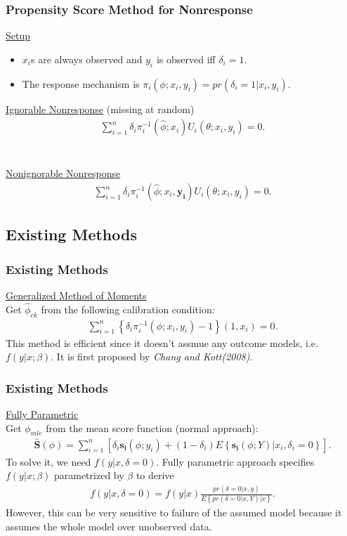 \documentclass{beamer}
\newcommand{\bra}[1]{\left(#1\right)}
\newcommand{\cbra}[1]{\left\{#1\right\}}
\newcommand{\sbra}[1]{\left[#1\right]}
\newcommand{\e}[1]{$\displaystyle{#1}$}
\newcommand{\al}[1]{\begin{align*}#1\end{align*}}
\begin{document}
\begin{frame}
\frametitle{Propensity Score Method for Nonresponse}
\underline{Setup}
\begin{itemize}
\item \e{x_i}s are always observed and \e{y_i} is observed iff \e{\delta_i=1}.
\item The response mechanism is \e{\pi_i\bra{\phi; x_i, y_i} = pr\bra{\delta_i=1 | x_i, y_i}}.
\end{itemize}\bigskip

\underline{Ignorable Nonresponse} (missing at random)
\al{\sum_{i=1}^{n} \delta_{i} {\pi_{i}^{-1}\bra{\hat\phi; x_i}U_i\bra{\theta; x_i, y_i}} = 0.}\\~\\

\underline{Nonignorable Nonresponse}
\al{\sum_{i=1}^{n} \delta_{i} {\pi_{i}^{-1}\bra{\hat\phi; x_i, \bm{y_i}}U_i\bra{\theta; x_i, y_i}} = 0.}
\end{frame}

\subsection{Existing Methods}
\begin{frame}
\frametitle{Existing Methods}
\underline{Generalized Method of Moments}\\\medskip
Get \e{\hat\phi_{ck}} from the following calibration condition:
\al{\sum_{i=1}^{n} \cbra{\delta_{i} \pi_{i}^{-1}\bra{\phi; x_i, y_i} - 1}\bra{1, x_i} = 0.}
This method is efficient since it doesn't assmue any outcome models, i.e. \e{f\bra{y|x;\beta}}.
It is first proposed by \textit{Chang and Kott(2008)}.
\end{frame}

\begin{frame}
\frametitle{Existing Methods}
\underline{Fully Parametric}\\\medskip
Get \e{\phi_{mle}} from the mean score function (normal approach):
\al{\bar{\bm{S}}\bra{\phi}=\sum_{i=1}^{n} \sbra{
	\delta_{i}\bm{s_i}\bra{\phi; y_i} + \bra{1-\delta_i}E\cbra{\bm{s_i}\bra{\phi; Y}|x_i, \delta_{i}=0}}.}
To solve it, we need \e{f\bra{y|x, \delta=0}}. Fully parametric approach specifies \e{f\bra{y|x; \beta}} parametrized by \e{\beta} to derive \al{f\bra{y|x, \delta=0} = f\bra{y|x} \frac{pr\bra{\delta=0|x, y}}{E\cbra{pr\bra{\delta=0|x, Y}| x}}.}
However, this can be very sensitive to failure of the assumed model because it assumes the whole model over unobserved data.
\end{frame}
\end{document}
